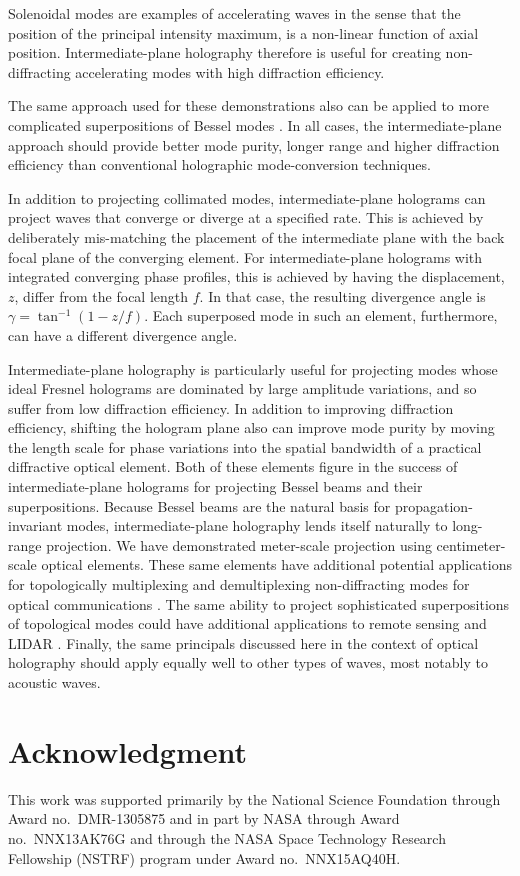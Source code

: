 Solenoidal modes are examples of accelerating waves \cite{berry79}
in the sense that the position of the principal intensity maximum,
is a non-linear function of axial position.
Intermediate-plane holography therefore is useful for creating
non-diffracting accelerating modes with high diffraction efficiency.

The same approach used for these demonstrations also can be
applied to more complicated superpositions of Bessel modes
\cite{cizmar09,vasilyeu09,lee10,litvin11}. %
In all cases, the intermediate-plane approach should provide
better mode purity, longer range and higher diffraction efficiency
than conventional holographic mode-conversion techniques.

In addition to projecting collimated modes, intermediate-plane
holograms can project waves that converge or diverge at
a specified rate.  This is achieved by deliberately mis-matching
the placement of the intermediate plane with the back focal
plane of the converging element.  For intermediate-plane holograms
with integrated converging phase profiles, this is achieved by
having the displacement, $z$, differ from the focal length $f$.
In that case, the resulting divergence angle is
$\gamma = \tan^{-1}(1 - z/f)$. %
Each superposed mode in such an element, furthermore, can have
a different divergence angle.

Intermediate-plane holography is particularly useful for projecting
modes whose ideal Fresnel holograms are dominated by large
amplitude variations, and so suffer from low diffraction efficiency.
In addition to improving diffraction efficiency, shifting the
hologram plane also can improve mode purity by moving the
length scale for phase variations into the spatial bandwidth of a
practical diffractive optical element.
Both of these elements figure in the success of intermediate-plane
holograms for projecting Bessel beams and their superpositions.
Because Bessel beams are the natural basis for propagation-invariant
modes, intermediate-plane holography lends itself naturally
to long-range projection.
We have demonstrated meter-scale projection using centimeter-scale
optical elements.
These same elements have additional potential applications for
topologically multiplexing and demultiplexing non-diffracting modes
for optical communications \cite{gibson04,bozinovic13,willner15}.
The same ability to project sophisticated superpositions of
topological modes could have additional applications to remote
sensing and LIDAR \cite{cvijetic15}.
Finally, the same principals discussed here in the context of
optical holography should apply equally well to other types
of waves, most notably to acoustic waves.


\section{Acknowledgment}
This work was supported primarily by the National Science Foundation
through Award no.\ DMR-1305875 and in part by NASA through
Award no.\ NNX13AK76G and through the NASA Space Technology Research
Fellowship (NSTRF) program under Award no.\ NNX15AQ40H.




